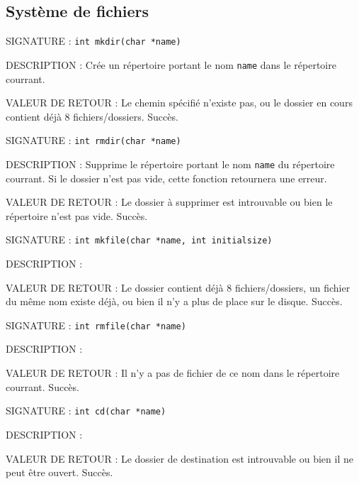 \documentclass{article}
\begin{document}
	\subsection{Système de fichiers}
		\begin{description}
			\item{SIGNATURE : } \texttt{int mkdir(char *name)}
			\item{DESCRIPTION : } Crée un répertoire portant le nom \texttt{name} dans le répertoire courrant.
			\item{VALEUR DE RETOUR : } 
				 Le chemin spécifié n'existe pas, ou le dossier en cours contient déjà 8 fichiers/dossiers.
				 Succès.
		\end{description}
		\vspace{2.5mm}
		\begin{description}
			\item{SIGNATURE : } \texttt{int rmdir(char *name)}
			\item{DESCRIPTION : } Supprime le répertoire portant le nom \texttt{name} du répertoire courrant. Si le dossier n'est pas vide, cette fonction retournera une erreur.
			\item{VALEUR DE RETOUR : } 
				 Le dossier à supprimer est introuvable ou bien le répertoire n'est pas vide.
				\subitem{\texttt{1} : } Succès.
		\end{description}
		\vspace{2.5mm}
		\begin{description}
			\item{SIGNATURE : } \texttt{int mkfile(char *name, int initialsize)}
			\item{DESCRIPTION : } 
			\item{VALEUR DE RETOUR : } 
				 Le dossier contient déjà 8 fichiers/dossiers, un fichier du même nom existe déjà, ou bien il n'y a plus de place sur le disque.
				 Succès.
		\end{description}
		\vspace{2.5mm}
		\begin{description}
			\item{SIGNATURE : } \texttt{int rmfile(char *name)}
			\item{DESCRIPTION : } 
			\item{VALEUR DE RETOUR : } 
				 Il n'y a pas de fichier de ce nom dans le répertoire courrant.
				\subitem{\texttt{1} : } Succès.
		\end{description}
		\vspace{2.5mm}
		\begin{description}
			\item{SIGNATURE : } \texttt{int cd(char *name)}
			\item{DESCRIPTION : } 
			\item{VALEUR DE RETOUR : } 
				 Le dossier de destination est introuvable ou bien il ne peut être ouvert.
				 Succès.
		\end{description}
		\vspace{2.5mm}
	
\end{document}
